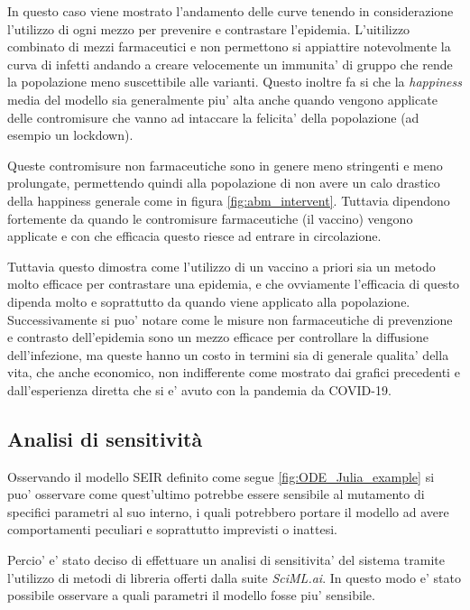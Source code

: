 In questo caso viene mostrato l'andamento delle curve tenendo in considerazione l'utilizzo di ogni mezzo
per prevenire e contrastare l'epidemia. L'uitilizzo combinato di mezzi farmaceutici e non permettono 
si appiattire notevolmente la curva di infetti andando a creare velocemente un immunita' di gruppo 
che rende la popolazione meno suscettibile alle varianti. Questo inoltre fa si che la \emph{happiness} media
del modello sia generalmente piu' alta anche quando vengono applicate delle contromisure che vanno ad 
intaccare la felicita' della popolazione (ad esempio un lockdown). 

Queste contromisure non farmaceutiche sono in genere meno stringenti e meno prolungate, permettendo quindi
alla popolazione di non avere un calo drastico della happiness generale come in figura \ref{fig:abm_intervent}.
Tuttavia dipendono fortemente da quando le contromisure farmaceutiche (il vaccino) vengono applicate
e con che efficacia questo riesce ad entrare in circolazione. 

Tuttavia questo dimostra come l'utilizzo di un vaccino a priori sia un metodo molto efficace per contrastare
una epidemia, e che ovviamente l'efficacia di questo dipenda molto e soprattutto da quando viene applicato 
alla popolazione. Successivamente si puo' notare come le misure non farmaceutiche di prevenzione e contrasto
dell'epidemia sono un mezzo efficace per controllare la diffusione dell'infezione, ma queste hanno un costo 
in termini sia di generale qualita' della vita, che anche economico, non indifferente come mostrato dai grafici 
precedenti e dall'esperienza diretta che si e' avuto con la pandemia da COVID-19. 

\subsection{Analisi di sensitività}
Osservando il modello SEIR definito come segue \ref{fig:ODE_Julia_example} 
si puo' osservare come quest'ultimo potrebbe essere sensibile al mutamento di specifici 
parametri al suo interno, i quali potrebbero portare il modello ad avere comportamenti 
peculiari e soprattutto imprevisti o inattesi.

Percio' e' stato deciso di effettuare un analisi di sensitivita' del sistema tramite l'utilizzo 
di metodi di libreria offerti dalla suite \emph{SciML.ai}. In questo modo e' stato possibile 
osservare a quali parametri il modello fosse piu' sensibile.

